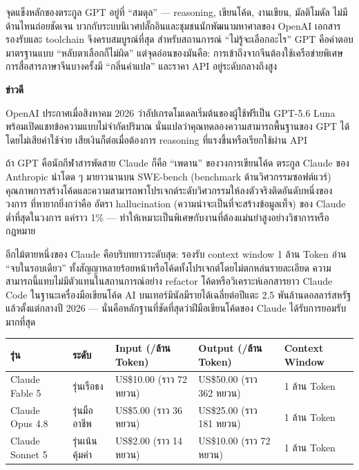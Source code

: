 จุดแข็งหลักของตระกูล GPT อยู่ที่ “สมดุล” — reasoning, เขียนโค้ด, งานเขียน, มัลติโมดัล ไม่มีด้านไหนถ่อยชัดเจน บวกกับระบบนิเวศปลั๊กอินและชุมชนนักพัฒนามหาศาลของ OpenAI เอกสารรองรับและ toolchain จึงครบสมบูรณ์ที่สุด สำหรับสถานการณ์ “ไม่รู้จะเลือกอะไร” GPT คือคำตอบมาตรฐานแบบ “หลับตาเลือกก็ไม่ผิด” แต่จุดอ่อนของมันคือ: การเข้าถึงจากจีนต้องใช้เครือข่ายพิเศษ การสื่อสารภาษาจีนบางครั้งมี “กลิ่นคำแปล” และราคา API อยู่ระดับกลางถึงสูง

\textbf{ข่าวดี}\par

OpenAI ประกาศเมื่อสิงหาคม 2026 ว่าอัปเกรดโมเดลเริ่มต้นของผู้ใช้ฟรีเป็น GPT-5.6 Luna พร้อมเปิดแชทข้อความแบบไม่จำกัดปริมาณ นั่นแปลว่าคุณทดลองความสามารถพื้นฐานของ GPT ได้โดยไม่เสียค่าใช้จ่าย เสียเงินก็ต่อเมื่อต้องการ reasoning ที่แรงขึ้นหรือเรียกใช้ผ่าน API


ถ้า GPT คือนักกีฬาสารพัดสาย Claude ก็คือ “เพดาน” ของวงการเขียนโค้ด ตระกูล Claude ของ Anthropic นำโดด ๆ มายาวนานบน SWE-bench (benchmark ด้านวิศวกรรมซอฟต์แวร์) คุณภาพการสร้างโค้ดและความสามารถพาโปรเจกต์ระดับวิศวกรรมให้ลงตัวจริงติดอันดับหนึ่งของวงการ ที่หายากยิ่งกว่าคือ อัตรา hallucination (ความน่าจะเป็นที่จะสร้างข้อมูลเท็จ) ของ Claude ต่ำที่สุดในวงการ แค่ราว 1\% — ทำให้เหมาะเป็นพิเศษกับงานที่ต้องแม่นยำสูงอย่างวิชาการหรือกฎหมาย

อีกไม้ตายหนึ่งของ Claude คือบริบทยาวระดับสุด: รองรับ context window 1 ล้าน Token อ่าน “จบในรอบเดียว” ทั้งสัญญาหลายร้อยหน้าหรือโค้ดทั้งโปรเจกต์โดยไม่ตกหล่นรายละเอียด ความสามารถนี้แทบไม่มีตัวแทนในสถานการณ์อย่าง refactor โค้ดหรือวิเคราะห์เอกสารยาว Claude Code ในฐานะเครื่องมือเขียนโค้ด AI บนเทอร์มินัลมีรายได้เฉลี่ยต่อปีแตะ 2.5 พันล้านดอลลาร์สหรัฐแล้วตั้งแต่กลางปี 2026 — นั่นคือหลักฐานที่ชัดที่สุดว่าฝีมือเขียนโค้ดของ Claude ได้รับการยอมรับมากที่สุด

\begin{center}
\begin{tabularx}{\linewidth}{|X|X|X|X|X|}
\hline
\textbf{รุ่น} & \textbf{ระดับ} & \textbf{Input (/ล้าน Token)} & \textbf{Output (/ล้าน Token)} & \textbf{Context Window} \tabularnewline
\hline
Claude Fable 5 & รุ่นเรือธง & US\$10.00 (ราว 72 หยวน) & US\$50.00 (ราว 362 หยวน) & 1 ล้าน Token \tabularnewline
Claude Opus 4.8 & รุ่นมืออาชีพ & US\$5.00 (ราว 36 หยวน) & US\$25.00 (ราว 181 หยวน) & 1 ล้าน Token \tabularnewline
Claude Sonnet 5 & รุ่นเน้นคุ้มค่า & US\$2.00 (ราว 14 หยวน) & US\$10.00 (ราว 72 หยวน) & 1 ล้าน Token \tabularnewline
\hline
\end{tabularx}
\end{center}


